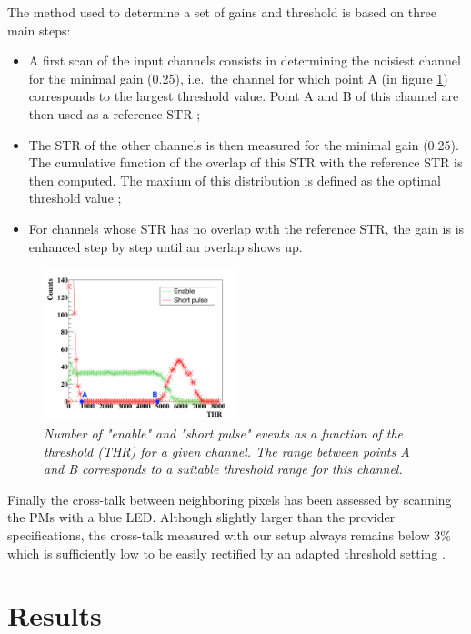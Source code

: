 \documentclass[a4paper,11pt]{article}
\begin{document}
The method used to determine a set of gains and threshold is based on three main steps:
\begin{itemize}
	\item A first scan of the input channels consists in determining the noisiest channel for the minimal gain (0.25), i.e.~the channel for which point A (in figure \ref{fig:S_Curve}) corresponds to the largest threshold value. Point A and B of this channel are then used as a reference STR ;
	\item The STR of the other channels is then measured for the minimal gain (0.25). The cumulative function of the overlap of this STR with the reference STR is then computed. The maxium of this distribution is defined as the optimal threshold value ;
	\item For channels whose STR has no overlap with the reference STR, the gain is is enhanced step by step until an overlap shows up.
\end{itemize}

\begin{figure}[htb]
\centering
\includegraphics[width=0.5\textwidth]{figures/S_Curve_Thr_suitable_rangeAB.pdf}
\caption{\small{\textit{Number of "enable" and "short pulse" events as a function of the threshold (THR) for a given channel. The range between points A and B corresponds to a suitable threshold range for this channel.}}}
\label{fig:S_Curve}
\end{figure}

Finally the cross-talk between neighboring pixels has been assessed by scanning the PMs with a blue LED. Although slightly larger than the provider specifications, the cross-talk measured with our setup always remains below 3\% which is sufficiently low to be easily rectified by an adapted threshold setting \cite{FontanaPhD}.

\section{Results}
\end{document}
